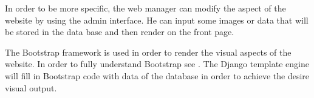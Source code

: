 In order to be more specific, the web manager can modify the aspect of the website by using the admin interface. He can input some images or data that will be stored in the data base and then render on the front page.

The Bootstrap framework is used in order to render the visual aspects of the website. In order to fully understand Bootstrap see \cite{Bootstrap, Bootstrap_doc}. The Django template engine will fill in Bootstrap code with data of the database in order to achieve the desire visual output. 



 


